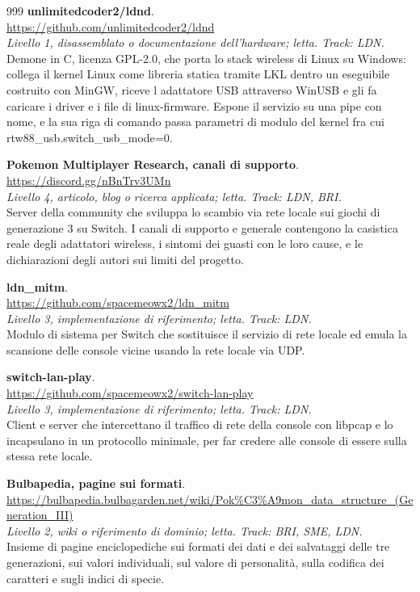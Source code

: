 \begin{thebibliography}{999}
  \textbf{unlimitedcoder2/ldnd}.
  \\ \url{https://github.com/unlimitedcoder2/ldnd}
  \\ \emph{Livello 1, disassemblato o documentazione dell'hardware; letta. Track: LDN.}
  \\ Demone in C, licenza GPL-2.0, che porta lo stack wireless di Linux su Windows: collega il kernel Linux come libreria statica tramite LKL dentro un eseguibile costruito con MinGW, riceve l adattatore USB attraverso WinUSB e gli fa caricare i driver e i file di linux-firmware. Espone il servizio su una pipe con nome, e la sua riga di comando passa parametri di modulo del kernel fra cui rtw88\_usb.switch\_usb\_mode=0.

  \textbf{Pokemon Multiplayer Research, canali di supporto}.
  \\ \url{https://discord.gg/nBnTrv3UMn}
  \\ \emph{Livello 4, articolo, blog o ricerca applicata; letta. Track: LDN, BRI.}
  \\ Server della community che sviluppa lo scambio via rete locale sui giochi di generazione 3 su Switch. I canali di supporto e generale contengono la casistica reale degli adattatori wireless, i sintomi dei guasti con le loro cause, e le dichiarazioni degli autori sui limiti del progetto.

  \textbf{ldn\_mitm}.
  \\ \url{https://github.com/spacemeowx2/ldn_mitm}
  \\ \emph{Livello 3, implementazione di riferimento; letta. Track: LDN.}
  \\ Modulo di sistema per Switch che sostituisce il servizio di rete locale ed emula la scansione delle console vicine usando la rete locale via UDP.

  \textbf{switch-lan-play}.
  \\ \url{https://github.com/spacemeowx2/switch-lan-play}
  \\ \emph{Livello 3, implementazione di riferimento; letta. Track: LDN.}
  \\ Client e server che intercettano il traffico di rete della console con libpcap e lo incapsulano in un protocollo minimale, per far credere alle console di essere sulla stessa rete locale.

  \textbf{Bulbapedia, pagine sui formati}.
  \\ \url{https://bulbapedia.bulbagarden.net/wiki/Pok\%C3\%A9mon_data_structure_(Generation_III)}
  \\ \emph{Livello 2, wiki o riferimento di dominio; letta. Track: BRI, SME, LDN.}
  \\ Insieme di pagine enciclopediche sui formati dei dati e dei salvataggi delle tre generazioni, sui valori individuali, sul valore di personalità, sulla codifica dei caratteri e sugli indici di specie.


\end{thebibliography}
